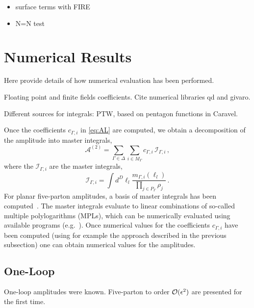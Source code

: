 \begin{itemize}
  \item surface terms with FIRE
  \item N=N test
\end{itemize}

\section{Numerical Results}

Here provide details of how numerical evaluation has been performed.

Floating point and finite fields coefficients.
Cite numerical libraries qd and givaro.

Different sources for integrals: PTW, based on pentagon functions in Caravel.



Once the coefficients $c_{\Gamma,i}$ in \cref{eq:AL} are computed,
we obtain a decomposition of the amplitude into master integrals,
\begin{equation}
  \mathcal{A}^{(2)}=\sum_{\Gamma\in\Delta}
  \sum_{i\in M_\Gamma} c_{\Gamma,i}\,
  \mathcal{I}_{\Gamma,i}\,,
  \label{eq:Amaster}
\end{equation}
where the $\mathcal{I}_{\Gamma,i}$ are the master integrals,
\begin{equation}
  \mathcal{I}_{\Gamma,i}=\int d^D\ell_l
  \frac{m_{\Gamma,i}(\ell_l)}
  {\prod_{j\in P_\Gamma}\rho_j}\,.
\end{equation}
For planar five-parton amplitudes, a basis of master integrals has been 
computed~\cite{Papadopoulos:2015jft,Gehrmann:2018yef}.
The master integrals evaluate to linear combinations of so-called 
multiple polylogarithms (MPLs), which can be 
numerically evaluated using available programs 
(e.g.\ \cite{Vollinga:2004sn}). Once numerical values for the coefficients 
$c_{\Gamma,i}$ have been  computed (using for example 
the approach described in the previous subsection) one can obtain numerical values
for the amplitudes.


\subsection{One-Loop}

One-loop amplitudes were known. Five-parton to order $\mathcal{O}(\epsilon^2)$ are presented for the first time.

